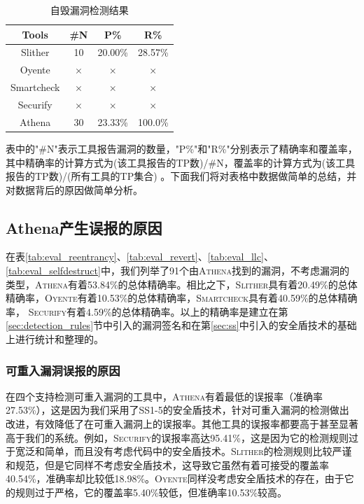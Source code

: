 \begin{table}[htbp]
\begin{minipage}[t]{0.48\textwidth}
  \label{tab:eval_llc}%
  \end{minipage}
  \begin{minipage}[t]{0.48\textwidth}
    \caption{自毁漏洞检测结果}
    \begin{tabular}{cccc}
    \toprule
    Tools & \#N & P\% & R\% \\
    \midrule
    Slither & 10    & 20.00\%    & 28.57\% \\
    Oyente  & $\times$ & $\times$ & $\times$ \\
    Smartcheck  & $\times$ & $\times$ & $\times$ \\
    Securify & $\times$  & $\times$ & $\times$ \\
    Athena & 30    & 23.33\%     & 100.0\% \\
    \bottomrule
    \end{tabular}%
  \label{tab:eval_selfdestruct}%
  \end{minipage}
    \label{tab:eval_all}
\end{table}%

表中的"\#N"表示工具报告漏洞的数量，"P\%"和"R\%"分别表示了精确率和覆盖率，其中精确率的计算方式为(该工具报告的TP数)/\#N，覆盖率的计算方式为(该工具报告的TP数)/(所有工具的TP集合) 。下面我们将对表格中数据做简单的总结，并对数据背后的原因做简单分析。

\subsection{Athena产生误报的原因}

在表\ref{tab:eval_reentrancy}、\ref{tab:eval_revert}、\ref{tab:eval_llc}、\ref{tab:eval_selfdestruct}中，我们列举了91个由\textsc{Athena}找到的漏洞，不考虑漏洞的类型，\textsc{Athena}有着53.84\%的总体精确率。相比之下，\textsc{Slither}具有着20.49\%的总体精确率，\textsc{Oyente}有着10.53\%的总体精确率，\textsc{Smartcheck}具有着40.59\%的总体精确率， \textsc{Securify}有着4.59\%的总体精确率。以上的精确率是建立在第\ref{sec:detection_rules}节中引入的漏洞签名和在第\ref{sec:ss}中引入的安全盾技术的基础上进行统计和整理的。

\subsubsection{可重入漏洞误报的原因}

在四个支持检测可重入漏洞的工具中，\textsc{Athena}有着最低的误报率（准确率27.53\%），这是因为我们采用了SS1-5的安全盾技术，针对可重入漏洞的检测做出改进，有效降低了在可重入漏洞上的误报率。其他工具的误报率都要高于甚至显著高于我们的系统。例如，\textsc{Securify}的误报率高达95.41\%，这是因为它的检测规则过于宽泛和简单，而且没有考虑代码中的安全盾技术。\textsc{Slither}的检测规则比较严谨和规范，但是它同样不考虑安全盾技术，这导致它虽然有着可接受的覆盖率40.54\%，准确率却比较低18.98\%。\textsc{Oyente}同样没考虑安全盾技术的存在，由于它的规则过于严格，它的覆盖率5.40\%较低，但准确率10.53\%较高。

